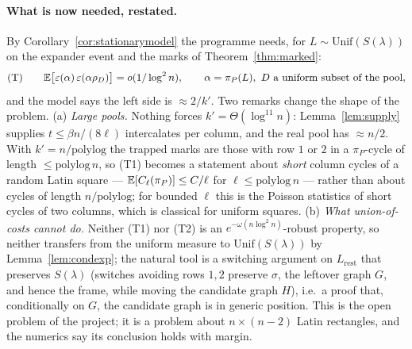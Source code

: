 \paragraph{What is now needed, restated.}  By
Corollary~\ref{cor:stationarymodel} the programme needs, for
$L\sim\mathrm{Unif}(S(\lambda))$ on the expander event and the marks of
Theorem~\ref{thm:marked}:
\[
\text{(T)}\qquad
\mathbb{E}\bigl[\varepsilon(\alpha)\,\varepsilon(\alpha\rho_D)\bigr]=o(1/\log^2n),
\qquad \alpha=\pi_P(L),\ D\text{ a uniform subset of the pool},
\]
and the model says the left side is $\approx2/k'$.  Two remarks
change the shape of the problem.  (a) \emph{Large pools.}  Nothing
forces $k'=\Theta(\log^{11}n)$: Lemma~\ref{lem:supply} supplies
$t\le\beta n/(8\ell)$ intercalates per column, and the real pool has
$\approx n/2$.  With $k'=n/\mathrm{polylog}$ the trapped marks are
those with row $1$ or $2$ in a $\pi_P$-cycle of length
$\le\mathrm{polylog}\,n$, so (T1) becomes a statement about
\emph{short} column cycles of a random Latin square ---
$\mathbb{E}[C_\ell(\pi_P)]\le C/\ell$ for $\ell\le\mathrm{polylog}\,n$ --- rather
than about cycles of length $n/\mathrm{polylog}$; for bounded $\ell$
this is the Poisson statistics of short cycles of two columns, which
is classical for uniform squares.  (b) \emph{What union-of-costs
cannot do.}  Neither (T1) nor (T2) is an $e^{-\omega(n\log^2n)}$-robust
property, so neither transfers from the uniform measure to
$\mathrm{Unif}(S(\lambda))$ by Lemma~\ref{lem:condexp}; the natural
tool is a switching argument on $L_{\mathrm{rest}}$ that preserves
$S(\lambda)$ (switches avoiding rows $1,2$ preserve $\sigma$, the
leftover graph $G$, and hence the frame, while moving the candidate
graph $H$), i.e.\ a proof that, conditionally on $G$, the candidate
graph is in generic position.  This is the open problem of the
project; it is a problem about $n\times(n-2)$ Latin rectangles, and
the numerics say its conclusion holds with margin.

